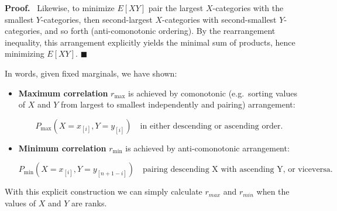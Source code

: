 \documentclass[
  12pt,
]{article}
\theoremstyle{plain}
\theoremstyle{definition}
\renewenvironment{proof}
   {\par\noindent\textbf{Proof.}\ }
   {\hfill$\blacksquare$\par}
\theoremstyle{remark}
\begin{document}
\begin{proof}
Likewise, to minimize \(E[XY]\) pair the largest \(X\)-categories with
the smallest \(Y\)-categories, then second-largest \(X\)-categories with
second-smallest \(Y\)-categories, and so forth (anti-comonotonic
ordering). By the rearrangement inequality, this arrangement explicitly
yields the minimal sum of products, hence minimizing \(E[XY]\).
\end{proof}

In words, given fixed marginals, we have shown:

\begin{itemize}
\item
  \textbf{Maximum correlation} \(r_{\text{max}}\) is achieved by
  comonotonic (e.g.~sorting values of \(X\) and \(Y\) from largest to
  smallest independently and pairing) arrangement:

  \[P_{\text{max}}(X=x_{[i]}, Y=y_{[i]}) \quad\text{in either descending or ascending order.}\]
\item
  \textbf{Minimum correlation} \(r_{\text{min}}\) is achieved by
  anti-comonotonic arrangement:

  \[P_{\text{min}}(X=x_{[i]}, Y=y_{[n+1-i]}) \quad\text{pairing descending X with ascending Y, or viceversa.}\]
\end{itemize}

With this explicit construction we can simply calculate \(r_{max}\) and
\(r_{min}\) when the values of \(X\) and \(Y\) are ranks.
\end{document}
